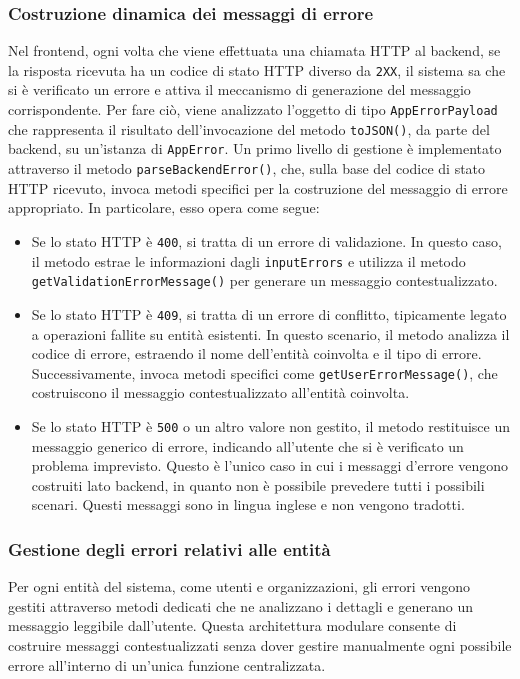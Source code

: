\subsubsection{Costruzione dinamica dei messaggi di errore}
Nel frontend, ogni volta che viene effettuata una chiamata HTTP al backend, se la risposta ricevuta ha un codice di stato HTTP diverso da \texttt{2XX}, il sistema sa che si è verificato un errore e attiva il meccanismo di generazione del messaggio corrispondente. Per fare ciò, viene analizzato l’oggetto di tipo \texttt{AppErrorPayload} che rappresenta il risultato dell'invocazione del metodo \texttt{toJSON()}, da parte del backend, su un'istanza di \texttt{AppError}.
%
Un primo livello di gestione è implementato attraverso il metodo \texttt{parseBackendError()}, che, sulla base del codice di stato HTTP ricevuto, invoca metodi specifici per la costruzione del messaggio di errore appropriato. In particolare, esso opera come segue:
\begin{itemize}
  \item Se lo stato HTTP è \texttt{400}, si tratta di un errore di validazione. In questo caso, il metodo estrae le informazioni dagli \texttt{inputErrors} e utilizza il metodo \texttt{getValidationErrorMessage()} per generare un messaggio contestualizzato.
  \item Se lo stato HTTP è \texttt{409}, si tratta di un errore di conflitto, tipicamente legato a operazioni fallite su entità esistenti. In questo scenario, il metodo analizza il codice di errore, estraendo il nome dell’entità coinvolta e il tipo di errore. Successivamente, invoca metodi specifici come \texttt{getUserErrorMessage()}, che costruiscono il messaggio contestualizzato all'entità coinvolta.
  \item Se lo stato HTTP è \texttt{500} o un altro valore non gestito, il metodo restituisce un messaggio generico di errore, indicando all’utente che si è verificato un problema imprevisto. Questo è l'unico caso in cui i messaggi d'errore vengono costruiti lato backend, in quanto non è possibile prevedere tutti i possibili scenari. Questi messaggi sono in lingua inglese e non vengono tradotti.
\end{itemize}

% 

\subsubsection{Gestione degli errori relativi alle entità}
Per ogni entità del sistema, come utenti e organizzazioni, gli errori vengono gestiti attraverso metodi dedicati che ne analizzano i dettagli e generano un messaggio leggibile dall’utente. Questa architettura modulare consente di costruire messaggi contestualizzati senza dover gestire manualmente ogni possibile errore all’interno di un’unica funzione centralizzata.

